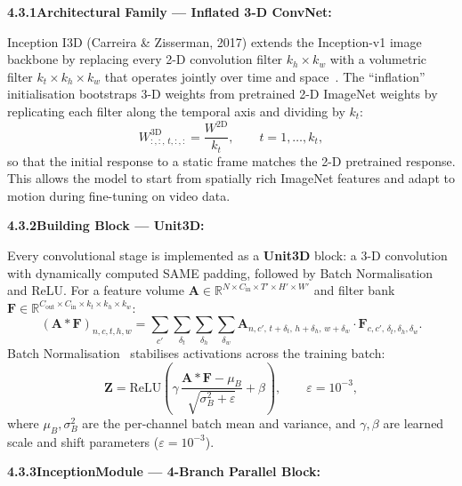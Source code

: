\noindent\textbf{4.3.1\quad Architectural Family --- Inflated 3-D ConvNet:}\par
{}
\vspace{0.3cm}

\noindent Inception I3D (Carreira \& Zisserman, 2017) extends the Inception-v1 image backbone by replacing every 2-D convolution filter $k_h \times k_w$ with a volumetric filter $k_t \times k_h \times k_w$ that operates jointly over time and space~\cite{li2020wlasl}. The ``inflation'' initialisation bootstraps 3-D weights from pretrained 2-D ImageNet weights by replicating each filter along the temporal axis and dividing by $k_t$:
\begin{equation}
W^{3\text{D}}_{:,:,\,t,:,:} = \frac{W^{2\text{D}}}{k_t}, \qquad t = 1,\ldots,k_t,
\label{eq:ch4-inflate}
\end{equation}
so that the initial response to a static frame matches the 2-D pretrained response. This allows the model to start from spatially rich ImageNet features and adapt to motion during fine-tuning on video data.\par\vspace{0.3cm}

\noindent\textbf{4.3.2\quad Building Block --- Unit3D:}\par
{}
\vspace{0.3cm}

\noindent Every convolutional stage is implemented as a \textbf{Unit3D} block: a 3-D convolution with dynamically computed SAME padding, followed by Batch Normalisation and ReLU. For a feature volume $\mathbf{A} \in \mathbb{R}^{N \times C_{\text{in}} \times T' \times H' \times W'}$ and filter bank $\mathbf{F} \in \mathbb{R}^{C_{\text{out}} \times C_{\text{in}} \times k_t \times k_h \times k_w}$:
\begin{equation}
(\mathbf{A} \!\ast\! \mathbf{F})_{n,c,t,h,w} = \sum_{c'} \sum_{\delta_t} \sum_{\delta_h} \sum_{\delta_w} \mathbf{A}_{n,c',\,t+\delta_t,\,h+\delta_h,\,w+\delta_w} \cdot \mathbf{F}_{c,c',\,\delta_t,\delta_h,\delta_w}.
\label{eq:ch4-3dconv}
\end{equation}
Batch Normalisation~\cite{ioffe2015batchnorm} stabilises activations across the training batch:
\begin{equation}
\mathbf{Z} = \mathrm{ReLU}\!\left(\gamma\,\frac{\mathbf{A}\!\ast\!\mathbf{F} - \mu_B}{\sqrt{\sigma_B^2 + \varepsilon}} + \beta\right), \qquad \varepsilon = 10^{-3},
\label{eq:ch4-bn}
\end{equation}
where $\mu_B, \sigma_B^2$ are the per-channel batch mean and variance, and $\gamma, \beta$ are learned scale and shift parameters ($\varepsilon = 10^{-3}$).\par\vspace{0.3cm}
\clearpage
\noindent\textbf{4.3.3\quad InceptionModule --- 4-Branch Parallel Block:}\par
{}
\vspace{0.3cm}

